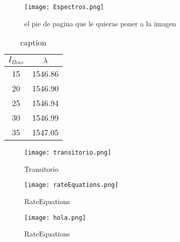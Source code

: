 \graphicspath{{../Graphics/Cpt1-Charactz/}}

	\begin{figure}[H]
		\centering
		\texttt{[image: Espectros.png]}
		\caption{\label{Img:widgets}el pie de pagina que le quieras 	poner a la imagen}
	\end{figure}

	\begin{table}[H]
		\centering
		\begin{tabular}{c c}
			\hline
			$I_{Bias}$ & $\lambda$ \\\hline 
			15 & 1546.86 \\
			20 & 1546.90 \\
			25 & 1546.94 \\
			30 & 1546.99 \\
			35 & 1547.05 \\\hline
		\end{tabular}
		\caption{\label{tab:label}caption}
	
	\end{table}

	\begin{figure}[H]
		\centering
		\texttt{[image: transitorio.png]}
		\caption{\label{fig:transitorio}Transitorio}	
	\end{figure}

		\begin{figure}[H]
			\centering
			\texttt{[image: rateEquations.png]}
			\caption{\label{fig:rateEquations}RateEquations}	
		\end{figure}

		\begin{figure}[H]
			\centering
			\texttt{[image: hola.png]}
			\caption{\label{fig:rateEquations}RateEquations}	
		\end{figure}
